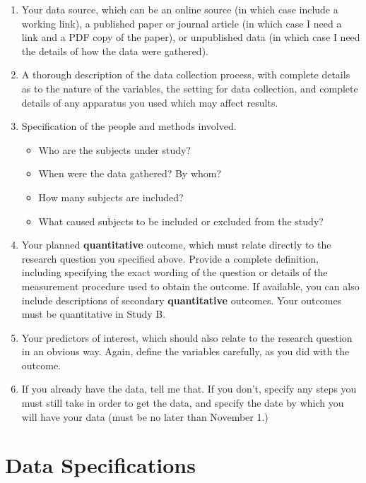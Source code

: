 \documentclass[]{book}
\providecommand{\tightlist}{%
  \setlength{\itemsep}{0pt}\setlength{\parskip}{0pt}}
\begin{document}
\begin{enumerate}
\def\labelenumi{\arabic{enumi}.}
\item
  Your data source, which can be an online source (in which case include a working link), a published paper or journal article (in which case I need a link and a PDF copy of the paper), or unpublished data (in which case I need the details of how the data were gathered).
\item
  A thorough description of the data collection process, with complete details as to the nature of the variables, the setting for data collection, and complete details of any apparatus you used which may affect results.
\item
  Specification of the people and methods involved.

  \begin{itemize}
  \tightlist
  \item
    Who are the subjects under study?
  \item
    When were the data gathered? By whom?
  \item
    How many subjects are included?
  \item
    What caused subjects to be included or excluded from the study?
  \end{itemize}
\item
  Your planned \textbf{quantitative} outcome, which must relate directly to the research question you specified above. Provide a complete definition, including specifying the exact wording of the question or details of the measurement procedure used to obtain the outcome. If available, you can also include descriptions of secondary \textbf{quantitative} outcomes. Your outcomes must be quantitative in Study B.
\item
  Your predictors of interest, which should also relate to the research question in an obvious way. Again, define the variables carefully, as you did with the outcome.
\item
  If you already have the data, tell me that. If you don't, specify any steps you must still take in order to get the data, and specify the date by which you will have your data (must be no later than November 1.)
\end{enumerate}

\hypertarget{data-specifications}{%
\section{Data Specifications}\label{data-specifications}}
\end{document}
